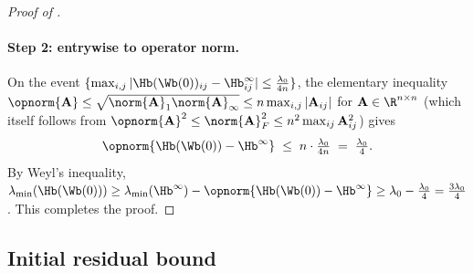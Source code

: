 \begin{proof}[Proof of ]
\paragraph{Step 2: entrywise to operator norm.}
On the event $\{ \max_{i,j} |\Hb(\Wb(0))_{ij} - \Hb^\infty_{ij}| \le \tfrac{\lambda_0}{4n} \}$, the elementary inequality $\opnorm{\mathbf A} \le \sqrt{ \norm{\mathbf A}_1 \norm{\mathbf A}_\infty } \le n \max_{i,j} |\mathbf A_{ij}|$ for $\mathbf A \in \R^{n \times n}$ (which itself follows from $\opnorm{\mathbf A}^2 \le \norm{\mathbf A}_F^2 \le n^2 \max_{ij} \mathbf A_{ij}^2$) gives
\begin{align*}
\opnorm{ \Hb(\Wb(0)) - \Hb^\infty }
\;\le\; n \cdot \tfrac{\lambda_0}{4 n}
\;=\; \tfrac{\lambda_0}{4}.
\end{align*}
By Weyl's inequality, $\lambda_{\min}(\Hb(\Wb(0))) \ge \lambda_{\min}(\Hb^\infty) - \opnorm{\Hb(\Wb(0)) - \Hb^\infty} \ge \lambda_0 - \tfrac{\lambda_0}{4} = \tfrac{3 \lambda_0}{4}$. This completes the proof.
\end{proof}

\subsection{Initial residual bound}\label{subsec:init_residual}

